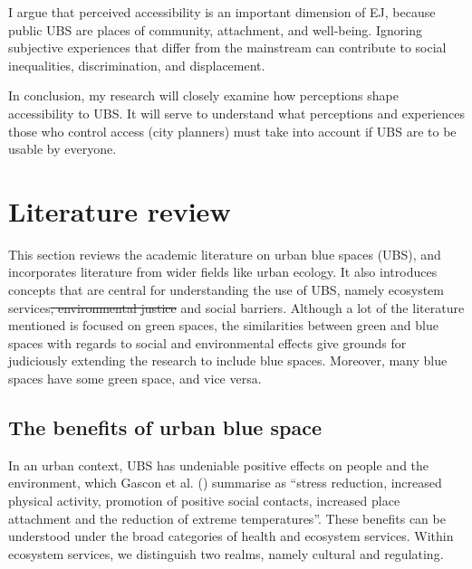\documentclass{article}
\begin{document}
I argue that perceived accessibility is an important dimension of EJ, because public UBS are places of community, attachment, and well-being. Ignoring subjective experiences that differ from the mainstream can contribute to social inequalities, discrimination, and displacement.

In conclusion, my research will closely examine how perceptions shape accessibility to UBS. It will serve to understand what perceptions and experiences those who control access (city planners) must take into account if UBS are to be usable by everyone.

\pagebreak
\section{Literature review}

This section reviews the academic literature on urban blue spaces (UBS), and incorporates literature from wider fields like urban ecology. It also introduces concepts that are central for understanding the use of UBS, namely ecosystem services\sout{, environmental justice} and social barriers. Although a lot of the literature mentioned is focused on green spaces, the similarities between green and blue spaces with regards to social and environmental effects give grounds for judiciously extending the research to include blue spaces. Moreover, many blue spaces have some green space, and vice versa.

\subsection{The benefits of urban blue space}

In an urban context, UBS has undeniable positive effects on people and the environment, which Gascon et al. (\citeyear{gascon2017outdoor}) summarise as ``stress reduction, increased physical activity, promotion of positive social contacts, increased place attachment and the reduction of extreme temperatures''. These benefits can be understood under the broad categories of health and ecosystem services. Within ecosystem services, we distinguish two realms, namely cultural and regulating.
\end{document}
